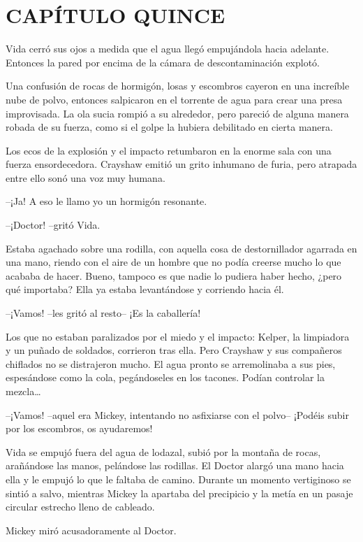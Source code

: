 \chapter*{CAPÍTULO QUINCE}

{Vida cerró sus ojos a medida que el agua llegó empujándola hacia
 adelante. Entonces la pared por encima de la cámara de descontaminación
explotó.}

{Una confusión de rocas de hormigón, losas y escombros cayeron en una
 increíble nube de polvo, entonces salpicaron en el torrente de agua para
 crear una presa improvisada. La ola sucia rompió a su alrededor, pero
 pareció de alguna manera robada de su fuerza, como si el golpe la
hubiera debilitado en cierta manera.}

{Los ecos de la explosión y el impacto retumbaron en la enorme sala con
 una fuerza ensordecedora. Crayshaw emitió un grito inhumano de furia,
pero atrapada entre ello sonó una voz muy humana.}

{--¡Ja! A eso le llamo yo un hormigón resonante.}

{--¡Doctor! --gritó Vida.}

{Estaba agachado sobre una rodilla, con aquella cosa de destornillador
 agarrada en una mano, riendo con el aire de un hombre que no podía
 creerse mucho lo que acababa de hacer. Bueno, tampoco es que nadie lo
 pudiera haber hecho, ¿pero qué importaba? Ella ya estaba levantándose y
corriendo hacia él.}

{--¡Vamos! --les gritó al resto-- ¡Es la caballería!}

{Los que no estaban paralizados por el miedo y el impacto: Kelper, la
 limpiadora y un puñado de soldados, corrieron tras ella. Pero Crayshaw y
 sus compañeros chiflados no se distrajeron mucho. El agua pronto se
 arremolinaba a sus pies, espesándose como la cola, pegándoseles en los
 tacones. Podían controlar la mezcla\ldots{}}

{--¡Vamos! --aquel era Mickey, intentando no asfixiarse con el polvo--
¡Podéis subir por los escombros, os ayudaremos!}

{Vida se empujó fuera del agua de lodazal, subió por la montaña de
 rocas, arañándose las manos, pelándose las rodillas. El Doctor alargó
 una mano hacia ella y le empujó lo que le faltaba de camino. Durante un
 momento vertiginoso se sintió a salvo, mientras Mickey la apartaba del
precipicio y la metía en un pasaje circular estrecho lleno de cableado.}

{Mickey miró acusadoramente al Doctor.}

